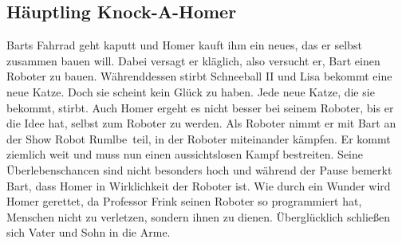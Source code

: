 
\subsection{Häuptling Knock-A-Homer}\label{FABF04}
Barts Fahrrad geht kaputt und Homer kauft ihm ein neues, das er selbst zusammen bauen will. Dabei versagt er kläglich, also versucht er, Bart einen Roboter zu bauen. Währenddessen stirbt Schneeball II und Lisa bekommt eine neue Katze. Doch sie scheint kein Glück zu haben. Jede neue Katze, die sie bekommt, stirbt. Auch Homer ergeht es nicht besser bei seinem Roboter, bis er die Idee hat, selbst zum Roboter zu werden. Als Roboter nimmt er mit Bart an der Show \glqq Robot Rumlbe\grqq\ teil, in der Roboter miteinander kämpfen. Er kommt ziemlich weit und muss nun einen aussichtslosen Kampf bestreiten. Seine Überlebenschancen sind nicht besonders hoch und während der Pause bemerkt Bart, dass Homer in Wirklichkeit der Roboter ist. Wie durch ein Wunder wird Homer gerettet, da Professor Frink seinen Roboter so programmiert hat, Menschen nicht zu verletzen, sondern ihnen zu dienen. Überglücklich schließen sich Vater und Sohn in die Arme.

